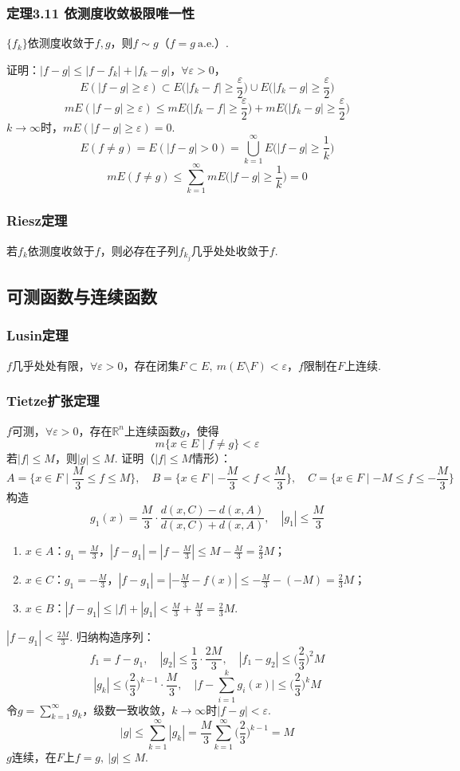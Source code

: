 \documentclass{article}
\begin{document}
	\subsubsection{定理3.11 依测度收敛极限唯一性}
	$\{f_k\}$依测度收敛于$f,g$，则$f\sim g$（$f=g\ \text{a.e.}$）.
	
	证明：$|f-g|\le|f-f_k|+|f_k-g|$，$\forall \varepsilon>0$，
	\[
	E(|f-g|\ge\varepsilon)\subset E\Big(|f_k-f|\ge\frac{\varepsilon}{2}\Big)\cup E\Big(|f_k-g|\ge\frac{\varepsilon}{2}\Big)
	\]
	\[
	mE(|f-g|\ge\varepsilon)\le mE\Big(|f_k-f|\ge\frac{\varepsilon}{2}\Big)+mE\Big(|f_k-g|\ge\frac{\varepsilon}{2}\Big)
	\]
	$k\to\infty$时，$mE(|f-g|\ge\varepsilon)=0$.
	\[
	E(f\ne g)=E(|f-g|>0)=\bigcup_{k=1}^{\infty}E\Big(|f-g|\ge\frac1k\Big)
	\]
	\[
	mE(f\ne g)\le\sum_{k=1}^{\infty}mE\Big(|f-g|\ge\frac1k\Big)=0
	\]
	
	\subsubsection{Riesz定理}
	若$f_k$依测度收敛于$f$，则必存在子列$f_{k_j}$几乎处处收敛于$f$.
	
	\subsection{可测函数与连续函数}
	\subsubsection{Lusin定理}
	$f$几乎处处有限，$\forall \varepsilon>0$，存在闭集$F\subset E,\ m(E\setminus F)<\varepsilon$，$f$限制在$F$上连续.
	
	\subsubsection{Tietze扩张定理}
	$f$可测，$\forall \varepsilon>0$，存在$\mathbb{R}^n$上连续函数$g$，使得
	\[
	m\big\{x\in E\mid f\ne g\big\}<\varepsilon
	\]
	若$|f|\le M$，则$|g|\le M$.
	证明（$|f|\le M$情形）：
	\[
	A=\Big\{x\in F\mid \frac{M}{3}\le f\le M\Big\},\quad B=\Big\{x\in F\mid -\frac{M}{3}<f<\frac{M}{3}\Big\},\quad C=\Big\{x\in F\mid -M\le f\le -\frac{M}{3}\Big\}
	\]
	构造
	\[
	g_1(x)=\frac{M}{3}\cdot\frac{d(x,C)-d(x,A)}{d(x,C)+d(x,A)},\quad |g_1|\le\frac{M}{3}
	\]
	\begin{enumerate}
		\item $x\in A$：$g_1=\frac{M}{3}$，$|f-g_1|=|f-\frac{M}{3}|\le M-\frac{M}{3}=\frac{2}{3}M$；
		\item $x\in C$：$g_1=-\frac{M}{3}$，$|f-g_1|=|-\frac{M}{3}-f(x)|\le -\frac{M}{3}-(-M)=\frac{2}{3}M$；
		\item $x\in B$：$|f-g_1|\le|f|+|g_1|<\frac{M}{3}+\frac{M}{3}=\frac{2}{3}M$.
	\end{enumerate}
	$|f-g_1|<\frac{2M}{3}$.
	归纳构造序列：
	\[
	f_1=f-g_1,\quad |g_2|\le\frac13\cdot\frac{2M}{3},\quad |f_1-g_2|\le\big(\frac{2}{3}\big)^2M
	\]
	\[
	|g_k|\le \big(\frac{2}{3}\big)^{k-1}\cdot\frac{M}{3},\quad \Big|f-\sum_{i=1}^{k}g_i(x)\Big|\le\big(\frac{2}{3}\big)^k M
	\]
	令$g=\sum\limits_{k=1}^{\infty}g_k$，级数一致收敛，$k\to\infty$时$|f-g|<\varepsilon$.
	\[
	|g|\le\sum_{k=1}^{\infty}|g_k|=\frac{M}{3}\sum_{k=1}^{\infty}\big(\frac{2}{3}\big)^{k-1}=M
	\]
	$g$连续，在$F$上$f=g,\ |g|\le M$.
	
\end{document}
